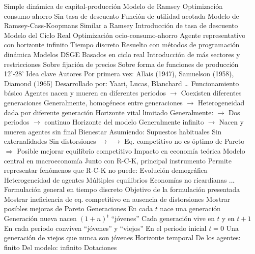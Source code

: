 \documentclass{nuevotema}
\begin{document}
\begin{esquemal}
				\4[] Simple dinámica de capital-producción
				\4 Modelo de Ramsey
				\4[] Optimización consumo-ahorro
				\4[] Sin tasa de descuento
				\4[] Función de utilidad acotada
				\4 Modelo de Ramsey-Cass-Koopmans
				\4[] Similar a Ramsey
				\4[] Introducción de tasa de descuento
			\3 Modelo del Ciclo Real
				\4 Optimización ocio-consumo-ahorro
				\4 Agente representativo con horizonte infinito
				\4 Tiempo discreto
				\4 Resuelto con métodos de programación dinámica
			\3 Modelos DSGE
				\4 Basados en ciclo real
				\4 Introducción de más sectores y restricciones
				\4[] Sobre fijación de precios
				\4[] Sobre forma de funciones de producción
	\1 12'-28'
		\2 Idea clave
			\3 Autores
				\4 Por primera vez:
				\4[] Allais (1947), Samuelson (1958), Diamond (1965)
				\4 Desarrollado por:
				\4[] Yaari, Lucas, Blanchard \ldots
			\3 Funcionamiento básico
				\4 Agentes nacen y mueren en diferentes periodos
				\4[] $\to$ Coexisten diferentes generaciones
				\4 Generalmente, homogéneos entre generaciones
				\4[] $\to$ Heterogeneidad dada por diferente generación
				\4[$\then$] Horizonte vital limitado
				\4[] Generalmente:
				\4[] $\to$ Dos periodos
				\4[] $\to$ continuo
				\4[$\then$] Horizonte del modelo
				\4[] Generalmente infinito
				\4[] $\to$ Nacen y mueren agentes sin final
			\3 Bienestar
				\4 Asumiendo:
				\4[] Supuestos habituales
				\4[] Sin externalidades
				\4[] Sin distorsiones
				\4[] $\to$ 
				\4[] $\to$ Eq. competitivo no es óptimo de Pareto
				\4[] $\Rightarrow$ Posible mejorar equilibrio competitivo
			\3 Impacto en economía teórica
				\4 Modelo central en macroeconomía
				\4 Junto con R-C-K, principal instrumento
				\4 Permite representar fenómenos que R-C-K no puede:
				\4[] Evolución demográfica
				\4[] Heterogeneidad de agentes
				\4[] Múltiples equilibrios
				\4[] Economías no ricardianas
				\4[] ...
		\2 Formulación general en tiempo discreto
			\3 Objetivo de la formulación presentada
				\4 Mostrar ineficiencia de eq. competitivo
				\4[] en ausencia de distorsiones
				\4 Mostrar posibles mejoras de Pareto
			\3 Generaciones
				\4 En cada $t$ nace una generación
				\4[] Generación nueva nacen $(1+n)^t$ ``jóvenes''
				\4 Cada generación vive en $t$ y en $t+1$
				\4[] En cada periodo conviven ``jóvenes'' y ``viejos''
				\4 En el periodo inicial $t=0$
				\4[] Una generación de viejos que nunca son jóvenes
				\4 Horizonte temporal
				\4[] De los agentes: finito
				\4[] Del modelo: infinito
			\3 Dotaciones

\end{esquemal}
\end{document}
